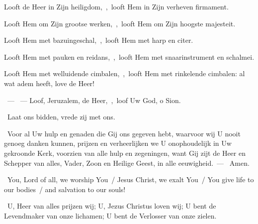 \documentclass[12pt,twoside,a5paper]{article}
\begin{document}
\begin{halfparskip}
   Looft de Heer in Zijn heiligdom,~\sep\ looft Hem in Zijn verheven firmament.

  Looft Hem om Zijn grootse werken,~\sep\ looft Hem om Zijn hoogste majesteit.

  Looft Hem met bazuingeschal,~\sep\ looft Hem met harp en citer.

  Looft Hem met pauken en reidans,~\sep\ looft Hem met snaarinstrument en schalmei.

  Looft Hem met welluidende cimbalen,~\sep\ looft Hem met rinkelende cimbalen: al wat adem heeft, love de Heer!
\end{halfparskip}

\begin{halfparskip}
  ~--- ~---  Loof, Jeruzalem, de Heer,~\sep\ loof Uw God, o Sion.
\end{halfparskip}

\begin{halfparskip}
  \dd~Laat ons bidden, vrede zij met ons.

  \cc~Voor al Uw hulp en genaden die Gij ons gegeven hebt, waarvoor wij U nooit genoeg danken kunnen, prijzen en verheerlijken we U onophoudelijk in Uw gekroonde Kerk, voorzien van alle hulp en zegeningen, want Gij zijt de Heer en Schepper van alles, Vader, Zoon en Heilige Geest, in alle eeuwigheid.~--- \rr~Amen.
\end{halfparskip}



\vspace{0.4em}
\begin{doublecols}
  \textsizexi

  \englishl \rr~You, Lord of all, we worship You~/ Jesus Christ, we exalt You~/ You give life to our bodies~/ and salvation to our souls!

   \rr~U, Heer van alles prijzen wij; U, Jezus Christus loven wij; U bent de Levendmaker van onze lichamen; U bent de Verlosser van onze zielen.
\end{doublecols}
\end{document}

